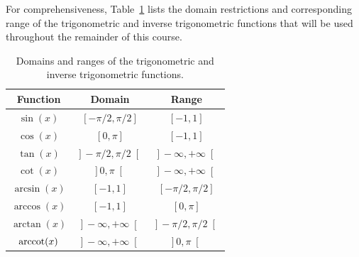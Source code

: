 \ifvc
For comprehensiveness, Table~\ref{tab_res_tri} lists the domain restrictions and corresponding range of the trigonometric and inverse trigonometric functions that will be used throughout the remainder of this course.


\begin{table}[h]
	\begin{tabular}{c|cc}
		Function & Domain & Range \\ \hline\hline
		\rule{0pt}{12pt} $\sin (x)$ & $[-\pi/2, \pi/2]$ & $[-1,1]$\\
		\rule{0pt}{12pt}$\cos (x)$ & $[0,\pi]$ & $[-1,1]$ \\
		\rule{0pt}{12pt}$\tan (x)$ & $\left.\right]-\pi/2,\pi/2\left.\right[$ & $\left.\right]-\infty,+\infty\left.\right[$	\\
		\rule{0pt}{12pt}$\cot (x)$ & $\left.\right]0,\pi\left.\right[$ & $\left.\right]-\infty,+\infty\left.\right[$\\[0.1cm] \hline
		$\arcsin (x)$ & $[-1,1]$ & $[-\pi/2, \pi/2]$ \\[0.1cm]
		$\arccos (x) $ & $[-1,1]$ & $[0,\pi]$\\[0.1cm]
		$\arctan (x) $ & $\left.\right]-\infty,+\infty\left.\right[$ & $\left.\right]-\pi/2,\pi/2\left.\right[$\\[0.1cm]
		$\operatorname{arccot} (x) $ &  $ \left.\right]-\infty,+\infty\left.\right[$ & $\left.\right]0,\pi\left.\right[$	\\[0.1cm]\hline\hline
	\end{tabular}
	\caption{Domains and ranges of the trigonometric and inverse trigonometric functions.}\label{tab_res_tri}
\end{table} 
\fi


